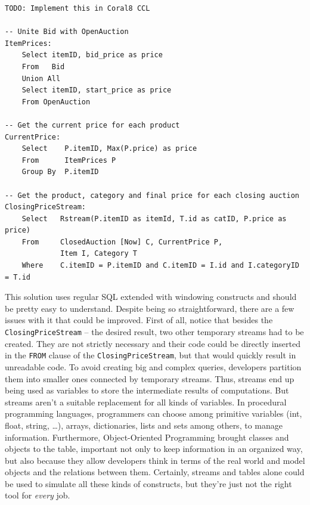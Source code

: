 \documentclass{report}
\begin{document}
\begin{verbatim}
TODO: Implement this in Coral8 CCL

-- Unite Bid with OpenAuction
ItemPrices:
    Select itemID, bid_price as price 
    From   Bid 
    Union All
    Select itemID, start_price as price 
    From OpenAuction

-- Get the current price for each product
CurrentPrice: 
    Select    P.itemID, Max(P.price) as price
    From      ItemPrices P
    Group By  P.itemID

-- Get the product, category and final price for each closing auction
ClosingPriceStream:
    Select   Rstream(P.itemID as itemId, T.id as catID, P.price as price)
    From     ClosedAuction [Now] C, CurrentPrice P, 
             Item I, Category T    
    Where    C.itemID = P.itemID and C.itemID = I.id and I.categoryID = T.id 
\end{verbatim}

This solution uses regular SQL extended with windowing constructs and
should be pretty easy to understand. Despite being so straightforward,
there are a few issues with it that could be improved. First of all,
notice that besides the \verb=ClosingPriceStream= -- the desired
result, two other temporary streams had to be created. They are not
strictly necessary and their code could be directly inserted in the
\verb=FROM= clause of the \verb=ClosingPriceStream=, but that would
quickly result in unreadable code. To avoid creating big and complex
queries, developers partition them into smaller ones connected by
temporary streams. Thus, streams end up being used as variables to
store the intermediate results of computations. But streams aren't a
suitable replacement for all kinds of variables. In procedural
programming languages, programmers can choose among primitive
variables (int, float, string, \dots), arrays, dictionaries, lists and
sets among others, to manage information. Furthermore, Object-Oriented
Programming brought classes and objects to the table, important not
only to keep information in an organized way, but also because they
allow developers think in terms of the real world and model objects
and the relations between them. Certainly, streams and tables alone
could be used to simulate all these kinds of constructs, but they're
just not the right tool for \emph{every} job.
\end{document}
